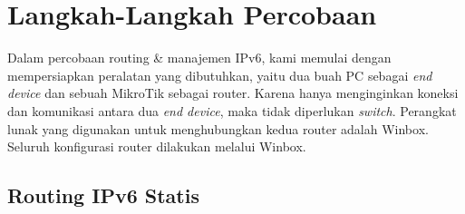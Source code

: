 
\section{Langkah-Langkah Percobaan}

Dalam percobaan routing \& manajemen IPv6, kami memulai dengan mempersiapkan peralatan yang dibutuhkan, yaitu dua buah PC sebagai \textit{end device} dan sebuah MikroTik sebagai router. Karena hanya menginginkan koneksi dan komunikasi antara dua \textit{end device}, maka tidak diperlukan \textit{switch}. Perangkat lunak yang digunakan untuk menghubungkan kedua router adalah Winbox. Seluruh konfigurasi router dilakukan melalui Winbox.


\subsection{Routing IPv6 Statis}
